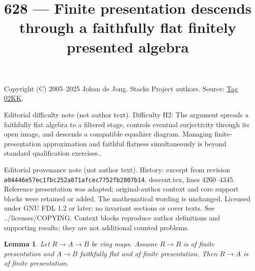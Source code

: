 \documentclass{amsart}
\theoremstyle{plain}
\newtheorem{lemma}[subsection]{Lemma}
\theoremstyle{definition}
\theoremstyle{remark}
\numberwithin{equation}{subsection}
\begin{document}
\title[Stacks Project, Tag 02KK]{628 --- Finite presentation descends through a faithfully flat finitely presented algebra}
\maketitle
\noindent Copyright (C) 2005--2025 Johan de Jong. Stacks Project authors. Source: \href{https://stacks.math.columbia.edu/tag/02KK}{Tag 02KK}.

\noindent Editorial difficulty note (not author text). Difficulty H2: The argument spreads a faithfully flat algebra to a filtered stage, controls eventual surjectivity through its open image, and descends a compatible equalizer diagram. Managing finite-presentation approximation and faithful flatness simultaneously is beyond standard qualification exercises..

\noindent Editorial provenance note (not author text). History: excerpt from revision \texttt{a0444\allowbreak 6e57e\allowbreak c1fbc\allowbreak 252a8\allowbreak 71afc\allowbreak ec775\allowbreak 2fb28\allowbreak 07b14}, descent.tex, lines 4260--4345. Reference presentation was adapted; original-author context and core support blocks were retained or added. The mathematical wording is unchanged. Licensed under GNU FDL 1.2 or later; no invariant sections or cover texts. See ../licenses/COPYING. Context blocks reproduce author definitions and supporting results; they are not additional counted problems.

\begin{lemma}
\label{lemma-flat-finitely-presented-permanence-algebra}
Let $R \to A \to B$ be ring maps.
Assume $R \to B$ is of finite presentation and
$A \to B$ faithfully flat and of finite presentation.
Then $R \to A$ is of finite presentation.
\end{lemma}
\end{document}
